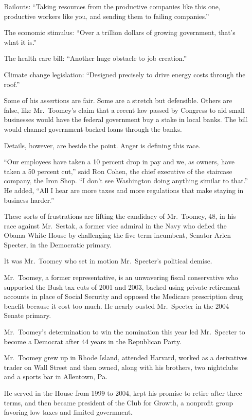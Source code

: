﻿\documentclass[12pt]{article}
\begin{document}
Bailouts: ``Taking resources from the productive companies like this one, productive workers like
you, and sending them to failing companies.''

The economic stimulus: ``Over a trillion dollars of growing government, that's what it is.''

The health care bill: ``Another huge obstacle to job creation.''

Climate change legislation: ``Designed precisely to drive energy costs through the roof.''

Some of his assertions are fair. Some are a stretch but defensible. Others are false, like
Mr.~Toomey's claim that a recent law passed by Congress to aid small businesses would have the
federal government buy a stake in local banks. The bill would channel government-backed loans
through the banks.

Details, however, are beside the point. Anger is defining this race.

``Our employees have taken a 10 percent drop in pay and we, as owners, have taken a 50 percent
cut,'' said Ron Cohen, the chief executive of the staircase company, the Iron Shop. ``I don't see
Washington doing anything similar to that.'' He added, ``All I hear are more taxes and more
regulations that make staying in business harder.''

These sorts of frustrations are lifting the candidacy of Mr.~Toomey, 48, in his race against
Mr.~Sestak, a former vice admiral in the Navy who defied the Obama White House by challenging the
five-term incumbent, Senator Arlen Specter, in the Democratic primary.

It was Mr.~Toomey who set in motion Mr.~Specter's political demise.

Mr.~Toomey, a former representative, is an unwavering fiscal conservative who supported the Bush tax
cuts of 2001 and 2003, backed using private retirement accounts in place of Social Security and
opposed the Medicare prescription drug benefit because it cost too much. He nearly ousted
Mr.~Specter in the 2004 Senate primary.

Mr.~Toomey's determination to win the nomination this year led Mr.~Specter to become a Democrat
after 44 years in the Republican Party.

Mr.~Toomey grew up in Rhode Island, attended Harvard, worked as a derivatives trader on Wall Street
and then owned, along with his brothers, two nightclubs and a sports bar in Allentown, Pa.

He served in the House from 1999 to 2004, kept his promise to retire after three terms, and then
became president of the Club for Growth, a nonprofit group favoring low taxes and limited
government.
\end{document}
